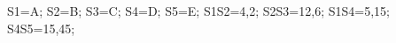 \documentclass[exercice]{thedocument}%
\begin{document}
%
    \>S1=A;%
    \>S2=B;%
    \>S3=C;%
    \>S4=D;%
    \>S5=E;%
    \>S1S2=4,2;%
    \>S2S3=12,6;%
    \>S1S4=5,15;%
    \>S4S5=15,45;%
\end{document}
